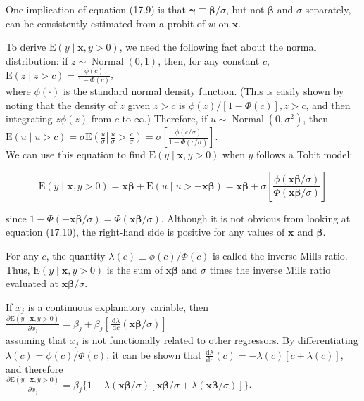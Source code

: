 \documentclass[10pt]{article}
\begin{document}
One implication of equation (17.9) is that $\boldsymbol{\gamma} \equiv \boldsymbol{\beta} / \sigma$, but not $\boldsymbol{\beta}$ and $\sigma$ separately, can be consistently estimated from a probit of $w$ on $\mathbf{x}$.

To derive $\mathrm{E}(y \mid \mathbf{x}, y>0)$, we need the following fact about the normal distribution: if $z \sim \operatorname{Normal}(0,1)$, then, for any constant $c$,\\
$\mathrm{E}(z \mid z>c)=\frac{\phi(c)}{1-\Phi(c)}$,\\
where $\phi(\cdot)$ is the standard normal density function. (This is easily shown by noting that the density of $z$ given $z>c$ is $\phi(z) /[1-\Phi(c)], z>c$, and then integrating $z \phi(z)$ from $c$ to $\infty$.) Therefore, if $u \sim \operatorname{Normal}\left(0, \sigma^{2}\right)$, then\\
$\mathrm{E}(u \mid u>c)=\sigma \mathrm{E}\left(\frac{u}{\sigma} \left\lvert\, \frac{u}{\sigma}>\frac{c}{\sigma}\right.\right)=\sigma\left[\frac{\phi(c / \sigma)}{1-\Phi(c / \sigma)}\right]$.\\
We can use this equation to find $\mathrm{E}(y \mid \mathbf{x}, y>0)$ when $y$ follows a Tobit model:


\begin{equation*}
\mathrm{E}(y \mid \mathbf{x}, y>0)=\mathbf{x} \boldsymbol{\beta}+\mathrm{E}(u \mid u>-\mathbf{x} \boldsymbol{\beta})=\mathbf{x} \boldsymbol{\beta}+\sigma\left[\frac{\phi(\mathbf{x} \boldsymbol{\beta} / \sigma)}{\Phi(\mathbf{x} \boldsymbol{\beta} / \sigma)}\right] \tag{17.10}
\end{equation*}


since $1-\Phi(-\mathbf{x} \boldsymbol{\beta} / \sigma)=\Phi(\mathbf{x} \boldsymbol{\beta} / \sigma)$. Although it is not obvious from looking at equation (17.10), the right-hand side is positive for any values of $\mathbf{x}$ and $\boldsymbol{\beta}$.

For any $c$, the quantity $\lambda(c) \equiv \phi(c) / \Phi(c)$ is called the inverse Mills ratio. Thus, $\mathrm{E}(y \mid \mathbf{x}, y>0)$ is the sum of $\mathbf{x} \boldsymbol{\beta}$ and $\sigma$ times the inverse Mills ratio evaluated at $\mathbf{x} \boldsymbol{\beta} / \sigma$.

If $x_{j}$ is a continuous explanatory variable, then\\
$\frac{\partial \mathrm{E}(y \mid \mathbf{x}, y>0)}{\partial x_{j}}=\beta_{j}+\beta_{j}\left[\frac{\mathrm{~d} \lambda}{\mathrm{~d} c}(\mathbf{x} \boldsymbol{\beta} / \sigma)\right]$\\
assuming that $x_{j}$ is not functionally related to other regressors. By differentiating $\lambda(c)=\phi(c) / \Phi(c)$, it can be shown that $\frac{\mathrm{d} \lambda}{\mathrm{d} c}(c)=-\lambda(c)[c+\lambda(c)]$, and therefore\\
$\frac{\partial \mathrm{E}(y \mid \mathbf{x}, y>0)}{\partial x_{j}}=\beta_{j}\{1-\lambda(\mathbf{x} \boldsymbol{\beta} / \sigma)[\mathbf{x} \boldsymbol{\beta} / \sigma+\lambda(\mathbf{x} \boldsymbol{\beta} / \sigma)]\}$.
\end{document}
